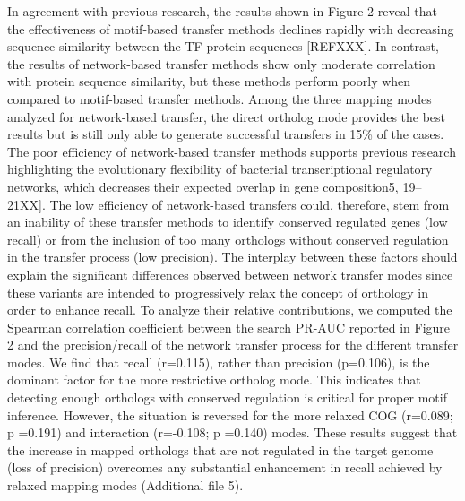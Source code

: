 In agreement with previous research, the results shown in Figure 2 reveal that
the effectiveness of motif-based transfer methods declines rapidly with
decreasing sequence similarity between the TF protein sequences [REFXXX]. In
contrast, the results of network-based transfer methods show only moderate
correlation with protein sequence similarity, but these methods perform poorly
when compared to motif-based transfer methods. Among the three mapping modes
analyzed for network-based transfer, the direct ortholog mode provides the best
results but is still only able to generate successful transfers in 15\% of the
cases. The poor efficiency of network-based transfer methods supports previous
research highlighting the evolutionary flexibility of bacterial transcriptional
regulatory networks, which decreases their expected overlap in gene
composition5, 19–21XX]. The low efficiency of network-based transfers could,
therefore, stem from an inability of these transfer methods to identify
conserved regulated genes (low recall) or from the inclusion of too many
orthologs without conserved regulation in the transfer process (low
precision). The interplay between these factors should explain the significant
differences observed between network transfer modes since these variants are
intended to progressively relax the concept of orthology in order to enhance
recall. To analyze their relative contributions, we computed the Spearman
correlation coefficient between the search PR-AUC reported in Figure 2 and the
precision/recall of the network transfer process for the different transfer
modes. We find that recall (r=0.115), rather than precision (p=0.106), is the
dominant factor for the more restrictive ortholog mode. This indicates that
detecting enough orthologs with conserved regulation is critical for proper
motif inference. However, the situation is reversed for the more relaxed COG
(r=0.089; p =0.191) and interaction (r=-0.108; p =0.140) modes. These results
suggest that the increase in mapped orthologs that are not regulated in the
target genome (loss of precision) overcomes any substantial enhancement in
recall achieved by relaxed mapping modes (Additional file 5).

